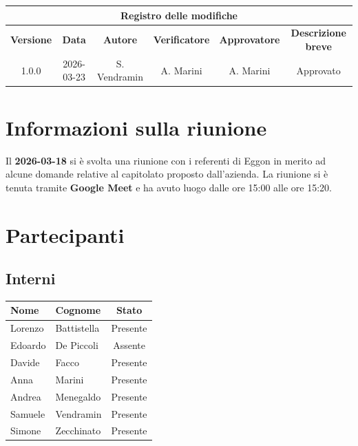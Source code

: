 \documentclass[a4paper, 10pt, colorlinks=true, linkcolor=black, urlcolor=blue, citecolor=blue, hidelinks]{article}
\begin{document}
\newcommand{\tipoverbale}{esterno}
\newcommand{\dataverbale}{2026-03-18}
\newcommand{\dataversione}{2026-03-23}
\newcommand{\versione}{1.0.0}
\newcommand{\stato}{Approvato}
\newcommand{\destinatari}{The Bitless, prof. T. Vardanega, prof. R. Cardin, Eggon}




\newpage

\begin{center}
    \thispagestyle{empty}
    \begin{tabular}{|c|c|c|c|c|c|}
                    \hline
                    \multicolumn{6}{|c|}{\textbf{Registro delle modifiche}} \\
                    \hline
                    \textbf{Versione} & \textbf{Data} & \textbf{Autore}  & \textbf{Verificatore} & \textbf{Approvatore} & \textbf{Descrizione breve} \\
                    \hline 
                    1.0.0 & 2026-03-23 & S. Vendramin &  A. Marini  & A. Marini & Approvato \\
                    \hline
                \end{tabular}
\end{center}

\newpage

\tableofcontents


\newpage
\section{Informazioni sulla riunione}
Il \textbf{2026-03-18} si è svolta una riunione con i referenti di Eggon in merito ad alcune domande relative al capitolato proposto dall'azienda. La riunione si è tenuta tramite \textbf{Google Meet} e ha avuto luogo dalle ore 15:00 alle ore 15:20.

\section{Partecipanti}

\subsection{Interni}

\begin{center}
\begin{tabular}{|l|l|c|}
\hline
\textbf{Nome} & \textbf{Cognome} & \textbf{Stato} \\
\hline
Lorenzo & Battistella & Presente \\
Edoardo & De Piccoli & Assente \\
Davide & Facco & Presente \\
Anna & Marini & Presente \\
Andrea & Menegaldo & Presente \\
Samuele & Vendramin & Presente \\
Simone & Zecchinato & Presente \\
\hline
\end{tabular}
\end{center}
\end{document}

